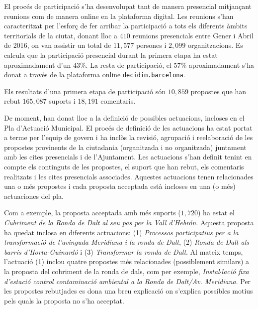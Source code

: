 \documentclass[final,10pt]{article}
\begin{document}
El proc\'es de participaci\'o s'ha desenvolupat tant de manera presencial mitjan\c{c}ant reunions com de manera online en la plataforma digital. 
Les reunions s'han caracteritzat per l'esfor\c{c} de fer arribar la participaci\'o a tots els diferents \`ambits territorials de la ciutat, donant lloc a $410$ reunions presencials entre Gener i Abril de 2016, on van assistir un total de $11,577$ persones i $2,099$ organitzacions.
Es calcula que la participaci\'o presencial durant la primera etapa ha estat aproximadament d'un $43\%$.
La resta de participaci\'o, el $57\%$ aproximadament s'ha donat a trav\'es de la plataforma online \texttt{decidim.barcelona}. 

Els resultats d'una primera etapa de participaci\'o s\'on $10,859$ propostes que han rebut $165,087$ suports i $18,191$ comentaris.

De moment, han donat lloc a la definici\'o de possibles actuacions, incloses en el Pla d'Actuaci\'o Municipal.
El proc\'es de definici\'o de les actuacions ha estat portat a terme per l'equip de govern i ha incl\`os la revisi\'o, agrupaci\'o i reelaboraci\'o de les propostes provinents de la ciutadania (organitzada i no organitzada) juntament amb les cites presencials i de l'Ajuntament.
Les actuacions s'han definit tenint en compte els continguts de les propostes, el suport que han rebut, els comentaris realitzats i les cites presencials associades.
Aquestes actuacions tenen relacionades una o m\'es propostes i cada proposta acceptada est\`a incloses en una (o m\'es) actuaciones del pla.

Com a exemple, la proposta acceptada amb m\'es suports ($1,720$) ha estat el \emph{Cubriment de la Ronda de Dalt al seu pas per la Vall d'Hebr\'on}. Aquesta proposta ha quedat inclosa en diferents actuacions: (1) \emph{Processos participatius per a la transformaci\'o de l’avinguda Meridiana i la ronda de Dalt}, (2) \emph{Ronda de Dalt als barris d'Horta-Guinard\'o} i (3) \emph{Transformar la ronda de Dalt}. Al mateix temps, l'actuaci\'o (1) inclou quatre propostes m\'es relacionades (possiblement similars) a la proposta del cobriment de la ronda de dals, com per exemple,
\emph{Instal$\cdot$laci\'o fixa d'estaci\'o control contaminaci\'o ambiental a la Ronda de Dalt/Av. Meridiana}.
Per les propostes rebutjades es dona una breu explicaci\'o on s'explica possibles motius pels quals la proposta no s'ha acceptat.
\end{document}
